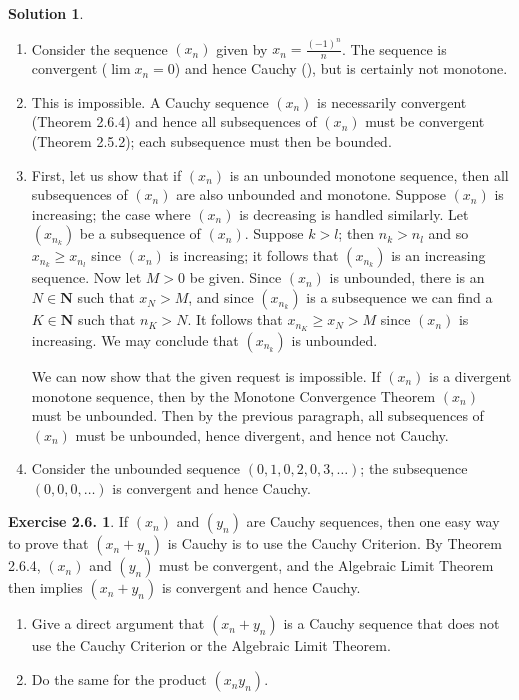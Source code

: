 \documentclass[12pt]{article}
\theoremstyle{definition}
\theoremstyle{exercise}
\newtheorem{exercise}{Exercise 2.6.}
\theoremstyle{solution}
\newtheorem*{solution}{Solution}
\newcommand{\N}{\mathbf{N}}
\begin{document}
\begin{solution}
    \begin{enumerate}
        \item Consider the sequence \( (x_n) \) given by \( x_n = \tfrac{(-1)^n}{n} \). The sequence is convergent (\( \lim x_n = 0 \)) and hence Cauchy (), but is certainly not monotone.

        \item This is impossible. A Cauchy sequence \( (x_n) \) is necessarily convergent (Theorem 2.6.4) and hence all subsequences of \( (x_n) \) must be convergent (Theorem 2.5.2); each subsequence must then be bounded.

        \item First, let us show that if \( (x_n) \) is an unbounded monotone sequence, then all subsequences of \( (x_n) \) are also unbounded and monotone. Suppose \( (x_n) \) is increasing; the case where \( (x_n) \) is decreasing is handled similarly. Let \( (x_{n_k}) \) be a subsequence of \( (x_n) \). Suppose \( k > l \); then \( n_k > n_l \) and so \( x_{n_k} \geq x_{n_l} \) since \( (x_n) \) is increasing; it follows that \( (x_{n_k}) \) is an increasing sequence. Now let \( M > 0 \) be given. Since \( (x_n) \) is unbounded, there is an \( N \in \N \) such that \( x_N > M \), and since \( (x_{n_k}) \) is a subsequence we can find a \( K \in \N \) such that \( n_K > N \). It follows that \( x_{n_K} \geq x_N > M \) since \( (x_n) \) is increasing. We may conclude that \( (x_{n_k}) \) is unbounded.

        We can now show that the given request is impossible. If \( (x_n) \) is a divergent monotone sequence, then by the Monotone Convergence Theorem \( (x_n) \) must be unbounded. Then by the previous paragraph, all subsequences of \( (x_n) \) must be unbounded, hence divergent, and hence not Cauchy.

        \item Consider the unbounded sequence \( (0, 1, 0, 2, 0, 3, \ldots) \); the subsequence \( (0, 0, 0, \ldots) \) is convergent and hence Cauchy.
    \end{enumerate}
\end{solution}

\begin{exercise}
\label{ex:3}
    If \( (x_n) \) and \( (y_n) \) are Cauchy sequences, then one easy way to prove that \( (x_n + y_n) \) is Cauchy is to use the Cauchy Criterion. By Theorem 2.6.4, \( (x_n) \) and \( (y_n) \) must be convergent, and the Algebraic Limit Theorem then implies \( (x_n + y_n) \) is convergent and hence Cauchy.
    \begin{enumerate}
        \item Give a direct argument that \( (x_n + y_n) \) is a Cauchy sequence that does not use the Cauchy Criterion or the Algebraic Limit Theorem.

        \item Do the same for the product \( (x_n y_n) \).
    \end{enumerate}
\end{exercise}
\end{document}

